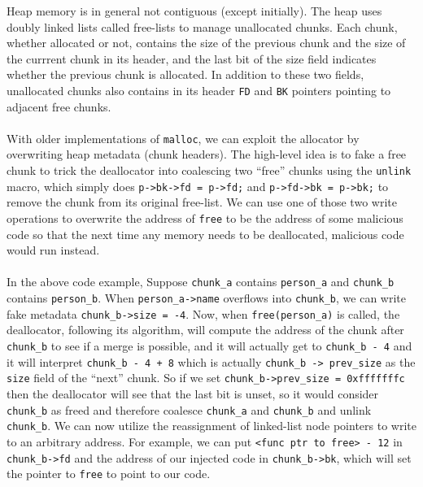 \documentclass{article}
\begin{document}
Heap memory is in general not contiguous (except initially). The heap uses doubly linked lists called free-lists to manage unallocated chunks. Each chunk, whether allocated or not, contains the size of the previous chunk and the size of the currrent chunk in its header, and the last bit of the size field indicates whether the previous chunk is allocated. In addition to these two fields, unallocated chunks also contains in its header \texttt{FD} and \texttt{BK} pointers pointing to adjacent free chunks.\\\\
With older implementations of \texttt{malloc}, we can exploit the allocator by overwriting heap metadata (chunk headers). The high-level idea is to fake a free chunk to trick the deallocator into coalescing two ``free'' chunks using the \texttt{unlink} macro, which simply does \texttt{p->bk->fd = p->fd;} and \texttt{p->fd->bk = p->bk;} to remove the chunk from its original free-list. We can use one of those two write operations to overwrite the address of \texttt{free} to be the address of some malicious code so that the next time any memory needs to be deallocated, malicious code would run instead. \\\\
In the above code example, Suppose \texttt{chunk\_a} contains \texttt{person\_a} and \texttt{chunk\_b} contains \texttt{person\_b}. When \texttt{person\_a->name} overflows into \texttt{chunk\_b}, we can write fake metadata \texttt{chunk\_b->size = -4}. Now, when \texttt{free(person\_a)} is called, the deallocator, following its algorithm, will compute the address of the chunk after \texttt{chunk\_b} to see if a merge is possible, and it will actually get to \texttt{chunk\_b - 4} and it will interpret \texttt{chunk\_b - 4 + 8} which is actually \texttt{chunk\_b -> prev\_size} as the \texttt{size} field of the ``next'' chunk. So if we set \texttt{chunk\_b->prev\_size = 0xfffffffc} then the deallocator will see that the last bit is unset, so it would consider \texttt{chunk\_b} as freed and therefore coalesce \texttt{chunk\_a} and \texttt{chunk\_b} and unlink \texttt{chunk\_b}. We can now utilize the reassignment of linked-list node pointers to write to an arbitrary address. For example, we can put \texttt{<func ptr to free> - 12} in \texttt{chunk\_b->fd} and the address of our injected code in \texttt{chunk\_b->bk}, which will set the pointer to \texttt{free} to point to our code.
\newpage
\end{document}
